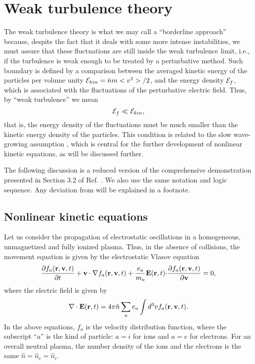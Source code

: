 \documentclass[12pt,a4paper,ruledheader]{report}
\def\calE{{\cal E}}
\begin{document}
\chapter{Weak turbulence theory}
\label{cha:weak-turb}
The weak turbulence theory is what we may call a ``borderline approach''
because, despite the fact that it deals with some more intense
instabilities, we must assure that these fluctuations are still inside
the weak turbulence limit, i.e., if the turbulence is weak enough to be
treated by a perturbative method. Such boundary is defined by a comparison
between the averaged kinetic energy of the particles per volume unity
$\calE_{kin}=\bar n m<v^2>/2$, and the energy density $\calE_f$, which
is associated with the fluctuations of the perturbative electric field.
Thus, by ``weak turbulence'' we mean
\begin{equation}
  \label{eq:weak}
  \calE_f \ll \calE_{kin},
\end{equation}
that is,
the energy density of the fluctuations must be much smaller
than the kinetic energy density of the particles. This condition is
related to the slow wave-growing assumption \cite{david}, which is
central for the further development of nonlinear kinetic equations,
as will be discussed further.

The following discussion is a reduced version of the
comprehensive demonstration presented in Section 3.2 of
Ref. \cite{Tigik2015}. We also use the same notation and
logic sequence. Any deviation from \cite{Tigik2015} will
be explained in a footnote.


\section{Nonlinear kinetic equations}
\label{sec:kin-gen-eq}
Let us consider the propagation of electrostatic oscillations
in a homogeneous, unmagnetized and fully ionized plasma. Thus,
in the absence of collisions, the movement equation is given
by the electrostatic Vlasov equation
\begin{equation}
  \label{vlasov-nl}
  \frac{\partial f_a({\bf r}, {\bf v},t)}{\partial t}
+{\bf v \cdot \nabla}f_a({\bf r}, {\bf v},t)
+\frac{e_a}{m_a}{\bf E}({\bf r},t){\bf \cdot}
\frac{\partial f_a({\bf r},{\bf v},t)}{\partial \bf v}=0,
\end{equation}
where the electric field is given by
\begin{equation}
   {\bf \nabla \cdot E}({\bf r},t)
   =4\pi \hat n \sum_a e_a\int d^3 v f_a({\bf r}, {\bf v},t). 
\end{equation}
In the above equations, $f_a$ is the velocity distribution function,
where the subscript ``$a$'' is the kind of particle: $a=i$ for ions
and $a=e$ for electrons. For an overall neutral plasma, the number
density of
the ions and the electrons is the same $\hat n = \hat n_e = \hat n_i$.
\end{document}
